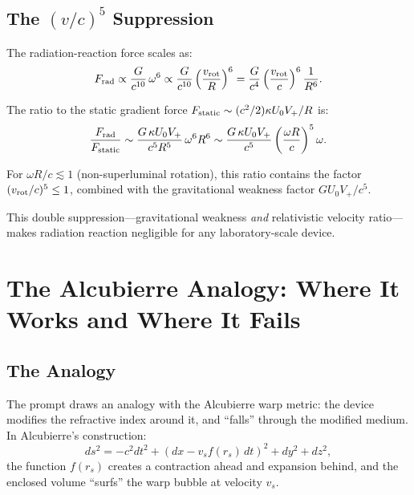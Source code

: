 \documentclass[11pt]{article}
\begin{document}
\subsection{The $(v/c)^5$ Suppression}

The radiation-reaction force scales as:
\begin{equation}
F_{\rm rad} \propto \frac{G}{c^{10}}\,\omega^6 \propto
\frac{G}{c^{10}}\left(\frac{v_{\rm rot}}{R}\right)^6
= \frac{G}{c^4}\left(\frac{v_{\rm rot}}{c}\right)^6\frac{1}{R^6}.
\end{equation}

The ratio to the static gradient force
$F_{\rm static} \sim (c^2/2)\kappa U_0 V_+ / R$ is:
\begin{equation}
\frac{F_{\rm rad}}{F_{\rm static}} \sim
\frac{G\,\kappa U_0 V_+}{c^5 R^5}\,\omega^6 R^6
\sim \frac{G\,\kappa U_0 V_+}{c^5}\left(\frac{\omega R}{c}\right)^5
\omega.
\end{equation}

For $\omega R / c \lesssim 1$ (non-superluminal rotation), this ratio
contains the factor $(v_{\rm rot}/c)^5 \leq 1$, combined with the
gravitational weakness factor $G U_0 V_+ / c^5$.

This double suppression---gravitational weakness \emph{and} relativistic
velocity ratio---makes radiation reaction negligible for any
laboratory-scale device.

\section{The Alcubierre Analogy: Where It Works and Where It Fails}
\label{sec:alcubierre}

\subsection{The Analogy}

The prompt draws an analogy with the Alcubierre warp metric: the device
modifies the refractive index around it, and ``falls'' through the
modified medium. In Alcubierre's construction:
\begin{equation}
ds^2 = -c^2 dt^2 + (dx - v_s f(r_s)\,dt)^2 + dy^2 + dz^2,
\end{equation}
the function $f(r_s)$ creates a contraction ahead and expansion
behind, and the enclosed volume ``surfs'' the warp bubble at velocity
$v_s$.
\end{document}
